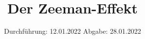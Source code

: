 

\subject{V27}
\title{Der Zeeman-Effekt}
\date{%
  Durchführung: 12.01.2022
  \hspace{3em}
  Abgabe: 28.01.2022
}



\maketitle
\thispagestyle{empty}
\tableofcontents
\newpage







\printbibliography{}


